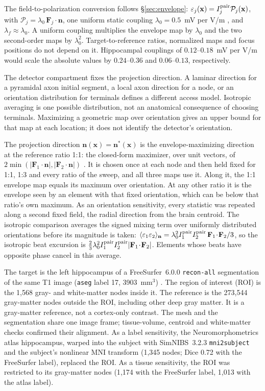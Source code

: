 \documentclass[11pt,a4paper]{article}
\begin{document}
The field-to-polarization conversion follows \S\ref{sec:envelope}:
$\varepsilon_j(\mathbf x)=I_j^{\rm pair}\mathcal P_j(\mathbf x)$, with
$\mathcal P_j=\lambda_0\,\mathbf F_j\!\cdot\!\mathbf n$, one uniform
static coupling $\lambda_0=0.5$~mV per V/m \cite{radman2009}, and
$\lambda_f\approx\lambda_0$. A uniform coupling multiplies the envelope map by
$\lambda_0$ and the two second-order maps by $\lambda_0^2$. Target-to-reference ratios,
normalized maps and focus positions do not depend on it. Hippocampal couplings of
$0.12$--$0.18$~mV per V/m \cite{bikson2004,deans2007} would scale the absolute values
by $0.24$--$0.36$ and $0.06$--$0.13$, respectively.

The detector compartment fixes the projection direction. A laminar direction for a pyramidal
axon initial segment, a local axon direction for a node, or an orientation
distribution for terminals defines a different access model. Isotropic averaging
is one possible distribution, not an anatomical consequence of choosing terminals.
Maximizing a geometric map over orientation gives an upper bound for that map
at each location; it does not identify the detector's orientation.

The projection direction $\mathbf n(\mathbf x)=\mathbf n^*(\mathbf x)$ is the envelope-maximizing direction at
the reference ratio 1:1: the closed-form maximizer, over unit vectors, of
$2\min(|\mathbf F_1\!\cdot\!\mathbf n|,|\mathbf F_2\!\cdot\!\mathbf n|)$
\cite{grossman2017}. It is chosen once at each node and then held fixed for 1:1, 1:3
and every ratio of the sweep, and all three maps use it. Along it, the 1:1 envelope map
equals its maximum over orientation. At any other ratio it is the envelope seen by an
element with that fixed orientation, which can be below that ratio's own maximum. As an
orientation sensitivity, every statistic was repeated along a second fixed field, the
radial direction from the brain centroid. The isotropic comparison averages the signed
mixing term over uniformly distributed orientations before its magnitude is taken:
$\langle\varepsilon_1\varepsilon_2\rangle_{\mathbf n}
=\lambda_0^2I_1^{\rm pair}I_2^{\rm pair}\,\mathbf F_1\!\cdot\!\mathbf F_2/3$, so the
isotropic beat excursion is
$\tfrac23\lambda_0^2I_1^{\rm pair}I_2^{\rm pair}|\mathbf F_1\!\cdot\!\mathbf F_2|$.
Elements whose beats have opposite phase cancel in this average.

The target is the left hippocampus of a FreeSurfer~6.0.0 \texttt{recon-all}
segmentation of the same T1 image (\texttt{aseg} label 17, 3903~mm$^3$)
\cite{fischl2002}. The region of interest (ROI) is the 1{,}568 gray- and white-matter
nodes inside it. The reference is the 273{,}544 gray-matter nodes outside the
ROI, including other deep gray matter. It is a gray-matter reference, not a cortex-only contrast.
The mesh and the segmentation share one image frame; tissue-volume, centroid and
white-matter checks confirmed their alignment. As a label sensitivity, the
Neuromorphometrics atlas hippocampus, warped into the subject with SimNIBS~3.2.3
\texttt{mni2subject} and the subject's nonlinear MNI transform (1{,}345 nodes; Dice 0.72
with the FreeSurfer label), replaced the ROI. As a tissue sensitivity, the ROI was
restricted to its gray-matter nodes (1{,}174 with the FreeSurfer label, 1{,}013 with
the atlas label).
\end{document}
